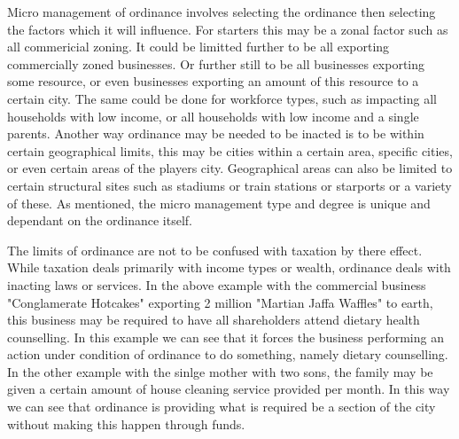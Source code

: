Micro management of ordinance involves selecting the ordinance then selecting the factors which it will influence. For starters this may be a zonal factor such as all commericial zoning. It could be limitted further to be all exporting commercially zoned businesses. Or further still to be all businesses exporting some resource, or even businesses exporting an amount of this resource to a certain city. The same could be done for workforce types, such as impacting all households with low income, or all households with low income and a single parents. Another way ordinance may be needed to be inacted is to be within certain geographical limits, this may be cities within a certain area, specific cities, or even certain areas of the players city. Geographical areas can also be limited to certain structural sites such as stadiums or train stations or starports or a variety of these. As mentioned, the micro management type and degree is unique and dependant on the ordinance itself.

The limits of ordinance are not to be confused with taxation by there effect. While taxation deals primarily with income types or wealth, ordinance deals with inacting laws or services. In the above example with the commercial business "Conglamerate Hotcakes" exporting 2 million "Martian Jaffa Waffles" to earth, this business may be required to have all shareholders attend dietary health counselling. In this example we can see that it forces the business performing an action under condition of ordinance to do something, namely dietary counselling. In the other example with the sinlge mother with two sons, the family may be given a certain amount of house cleaning service provided per month. In this way we can see that ordinance is providing what is required be a section of the city without making this happen through funds.  



